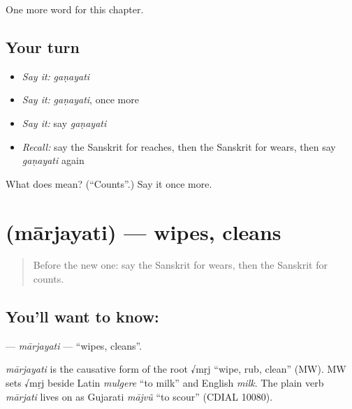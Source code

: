 \begin{grammarlens}[title={What you've built}]
One more word for this chapter.
\end{grammarlens}

\subsection*{Your turn}
\begin{itemize}
\raggedright
  \item \emph{Say it:} \emph{gaṇayati}
  \item \emph{Say it:} \emph{gaṇayati}, once more
  \item \emph{Say it:} say \emph{gaṇayati}
  \item \emph{Recall:} say the Sanskrit for reaches, then the Sanskrit for wears, then say \emph{gaṇayati} again
\end{itemize}

\begin{tcolorbox}[breakable,colback=teal!4,colframe=teal!35!black,title={Before you move on}]
What does  mean? (\textquotedblleft{}Counts\textquotedblright{}.) Say it once more.
\end{tcolorbox}
\section[\texorpdfstring{\sk{मार्जयति} (mārjayati)}{मार्जयति (mārjayati)}]{ (mārjayati) — wipes, cleans}

\label{lesson:SA-C136-marjayati}



\begin{quote}
Before the new one: say the Sanskrit for wears, then the Sanskrit for counts.
\end{quote}

\subsection*{You'll want to know: }
\textbf{} — \emph{mārjayati} — \textquotedblleft{}wipes, cleans\textquotedblright{}.

\begin{cousinweb}
\emph{mārjayati} is the causative form of the root √mṛj \textquotedblleft{}wipe, rub, clean\textquotedblright{} (MW). MW sets √mṛj beside Latin \emph{mulgere} \textquotedblleft{}to milk\textquotedblright{} and English \emph{milk}. The plain verb \emph{mārjati} lives on as Gujarati \emph{mājvũ} \textquotedblleft{}to scour\textquotedblright{} (CDIAL 10080).
\end{cousinweb}

